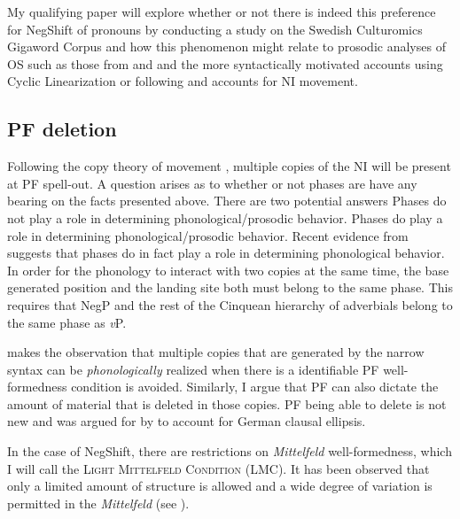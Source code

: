 \documentclass[12pt, letterpaper]{article}
\begin{document}
My qualifying paper will explore whether or not there is indeed this preference for NegShift of pronouns by conducting a study on the Swedish Culturomics Gigaword Corpus \citep{eideSwedishCulturomicsGigaword2016} and how this phenomenon might relate to prosodic analyses of OS such as those from \citet{erteschik-shirVariationMainlandScandinavian2020} and \citet{brinkerhoffMATCHINGPhrasesNorwegian2020} and the more syntactically motivated accounts using Cyclic Linearization \citep{foxCyclicLinearizationSyntactic2005,engelsScandinavianNegativeIndefinites2012} or following \citet{zeijlstraSyntacticallyComplexStatus2011} and  accounts for NI movement.

\subsection{PF deletion} \label{sec:NEXT}
\ea  Following the copy theory of movement \citet{chomskyMinimalistProgramLinguistic1993}, multiple copies of the NI will be present at PF spell-out. 
\ex A question arises as to whether or not phases are have any bearing on the facts presented above. 
\ex There are two potential answers
	\ea Phases do not play a role in determining phonological/prosodic behavior.  
	\ex Phases do play a role in determining phonological/prosodic behavior.
	\z 
\ex Recent evidence from \citet{weberPhasebasedConstraintsMatch2020} suggests that phases do in fact play a role in determining phonological behavior. 
\ex In order for the phonology to interact with two copies at the same time, the base generated position and the landing site both must belong to the same phase. 
	\ea This requires that NegP and the rest of the Cinquean hierarchy of adverbials \citep{cinqueAdverbsFunctionalHeads1999} belong to the same phase as \emph{v}P.
	\z

\ex \citet{kandybowiczGrammarRepetitionNupe2008} makes the observation that multiple copies that are generated by the narrow syntax can be \emph{phonologically} realized when there is a identifiable PF well-formedness condition is avoided. 
	\ea Similarly, I argue that PF can also dictate the amount of material that is deleted in those copies. 
	\ex PF being able to delete is not new and was argued for by \citet{ottDeletionClausalEllipsis2016} to account for German clausal ellipsis. 
	\z 

\ex In the case of NegShift, there are restrictions on \emph{Mittelfeld} well-formedness, which I will call the \textsc{Light Mittelfeld Condition} (LMC).
	\ea It has been observed that only a limited amount of structure is allowed and a wide degree of variation is permitted in the \emph{Mittelfeld} (see \cite{haiderMittelfeldPhenomenaScrambling2017}). 
\end{document}
